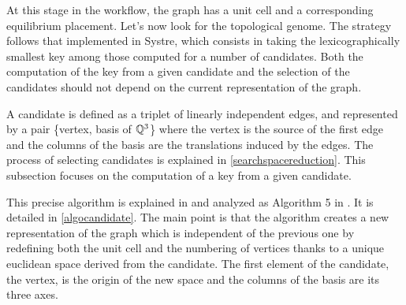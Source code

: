 \documentclass[main.tex]{subfiles}
\begin{document}
At this stage in the workflow, the graph has a unit cell and a corresponding equilibrium placement. Let's now look for the topological genome. The strategy follows that implemented in Systre, which consists in taking the lexicographically smallest key among those computed for a number of candidates. Both the computation of the key from a given candidate and the selection of the candidates should not depend on the current representation of the graph.

A candidate is defined as a triplet of linearly independent edges, and represented by a pair \{vertex, basis of $\mathbb{Q}^3$\} where the vertex is the source of the first edge and the columns of the basis are the translations induced by the edges. The process of selecting candidates is explained in \cref{searchspacereduction}. This subsection focuses on the computation of a key from a given candidate.\\

\label{searchspaceexploration}

This precise algorithm is explained in \cite{Systre} and analyzed as Algorithm 5 in \cite{barycentric}. It is detailed in \cref{algocandidate}. The main point is that the algorithm creates a new representation of the graph which is independent of the previous one by redefining both the unit cell and the numbering of vertices thanks to a unique euclidean space derived from the candidate. The first element of the candidate, the vertex, is the origin of the new space and the columns of the basis are its three axes.
\end{document}
